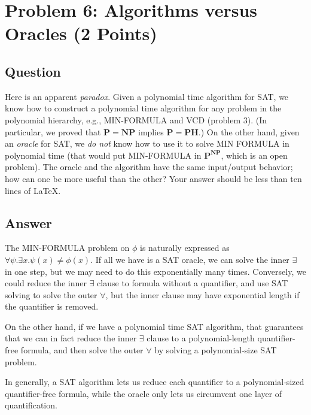 \documentclass{article}
\begin{document}
\newpage
\section*{Problem 6: Algorithms versus Oracles (2 Points)}

\subsection*{Question}
Here is an apparent {\em paradox}. Given a polynomial time algorithm for SAT, we know how to construct a polynomial time algorithm for any problem in the polynomial hierarchy, e.g., MIN-FORMULA and VCD (problem 3). (In particular, we proved that $\mathbf{P} = \mathbf{NP}$ implies $\mathbf{P} = \mathbf{PH}$.) On the other hand, given an \emph{oracle} for SAT, we \emph{do not} know how to use it to solve MIN FORMULA in polynomial time (that would put MIN-FORMULA in $\mathbf{P}^{\mathbf{NP}}$, which is an open problem). The oracle and the algorithm have the same input/output behavior; how can one be more useful than the other? Your answer should be less than ten lines of LaTeX.

\subsection*{Answer}

The MIN-FORMULA problem on $\phi$ is naturally expressed as $\forall \psi . \exists x . \psi(x) \neq \phi(x)$.  If all we have is a SAT oracle, we can solve the inner $\exists$ in one step, but we may need to do this exponentially many times.  Conversely, we could reduce the inner $\exists$ clause to formula without a quantifier, and use SAT solving to solve the outer $\forall$, but the inner clause may have exponential length if the quantifier is removed.

On the other hand, if we have a polynomial time SAT algorithm, that guarantees that we can in fact reduce the inner $\exists$ clause to a polynomial-length quantifier-free formula, and then solve the outer $\forall$ by solving a polynomial-size SAT problem.

In generally, a SAT algorithm lets us reduce each quantifier to a polynomial-sized quantifier-free formula, while the oracle only lets us circumvent one layer of quantification.

\end{document}
